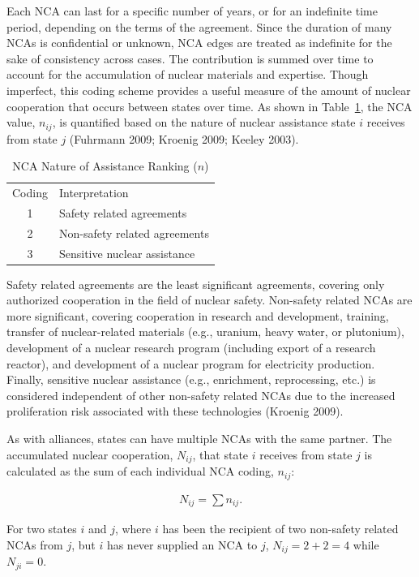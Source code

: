 \documentclass{article} %
\begin{document}
{Each NCA can last for a specific number of years, or for an indefinite time period, depending on the terms of the agreement. Since the duration of many NCAs is confidential or unknown, NCA edges are treated as indefinite for the sake of consistency across cases. The contribution is summed over time to account for the accumulation of nuclear materials and expertise. Though imperfect, this coding scheme provides a useful measure of the amount of nuclear cooperation that occurs between states over time. As shown in Table~\ref{tab:NCA}, the NCA value, $n_{ij}$, is quantified based on the nature of nuclear assistance state $i$ receives from state $j$ (Fuhrmann 2009; Kroenig 2009; Keeley 2003). 

\begin{table}
\centering
\caption{NCA Nature of Assistance Ranking ($n$)\label{tab:NCA}}
\begin{tabular}{c@{\hskip 0.35in}l}
\hline\noalign{\smallskip}
Coding & Interpretation\\
\noalign{\smallskip}
\hline
\noalign{\smallskip}
1 & Safety related agreements \\
2 & Non-safety related agreements \\
3 & Sensitive nuclear assistance \\
\hline
\end{tabular} 
\end{table}

Safety related agreements are the least significant agreements, covering only authorized cooperation in the field of nuclear safety. Non-safety related NCAs are more significant, covering cooperation in research and development, training, transfer of nuclear-related materials (e.g., uranium, heavy water, or plutonium), development of a nuclear research program (including export of a research reactor), and development of a nuclear program for electricity production. Finally, sensitive nuclear assistance (e.g., enrichment, reprocessing, etc.) is considered independent of other non-safety related NCAs due to the increased proliferation risk associated with these technologies (Kroenig 2009). 

As with alliances, states can have multiple NCAs with the same partner. The accumulated nuclear cooperation, $N_{ij}$, that state $i$ receives from state $j$ is calculated as the sum of each individual NCA coding, $n_{ij}$: 
\begin{center}
\begin{equation}
\begin{aligned}
N_{ij} = \sum n_{ij}.
\end{aligned}
\end{equation}
\end{center}
For two states $i$ and $j$, where $i$ has been the recipient of two non-safety related NCAs from $j$, but $i$ has never supplied an NCA to $j$, $N_{ij}=2+2=4$ while $N_{ji}=0$.


}
\end{document}

